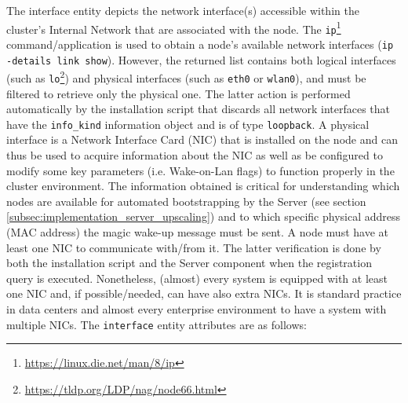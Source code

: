 The interface entity depicts the network interface(s) accessible within the
cluster's Internal Network that are associated with the node.
\newline
The \texttt{ip}\footnote{\url{https://linux.die.net/man/8/ip}} command/application
is used to obtain a node's available network interfaces (\texttt{ip -details
link show}). However, the returned list contains both logical interfaces (such as
\texttt{lo}\footnote{\url{https://tldp.org/LDP/nag/node66.html}}) and physical interfaces
(such as \texttt{eth0} or \texttt{wlan0}), and must be filtered to retrieve only
the physical one. The latter action is performed automatically by the installation
script that discards all network interfaces that have the \texttt{info\_kind}
information object and is of type \texttt{loopback}.
\newline
A physical interface is a Network Interface Card (NIC) that is installed on the
node and can thus be used to acquire information about the NIC as well as be
configured to modify some key parameters (i.e. Wake-on-Lan flags) to function properly
in the cluster environment. The information obtained is critical for
understanding which nodes are available for automated bootstrapping by the
Server (see section \ref{subsec:implementation_server_upscaling}) and to which
specific physical address (MAC address) the magic wake-up message must be sent.
\newline
A node must have at least one NIC to communicate with/from it. The latter
verification is done by both the installation script and the Server component
when the registration query is executed. Nonetheless, (almost) every system is
equipped with at least one NIC and, if possible/needed, can have also extra NICs.
It is standard practice in data centers and almost every enterprise environment to
have a system with multiple NICs.
\newline
The \texttt{interface} entity attributes are as follows:

